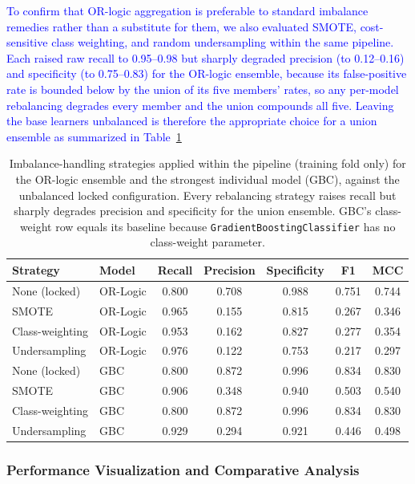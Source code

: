 \textcolor{blue}{To confirm that OR-logic aggregation is preferable to standard imbalance remedies rather than a substitute for them, we also evaluated SMOTE, cost-sensitive class weighting, and random undersampling within the same pipeline. Each raised raw recall to 0.95--0.98 but sharply degraded precision (to 0.12--0.16) and specificity (to 0.75--0.83) for the OR-logic ensemble, because its false-positive rate is bounded below by the union of its five members' rates, so any per-model rebalancing degrades every member and the union compounds all five. Leaving the base learners unbalanced is therefore the appropriate choice for a union ensemble as summarized in Table~\ref{tab:imbalance}}

\begin{table}[htbp]
\centering
\caption{Imbalance-handling strategies applied within the pipeline (training fold only) for the OR-logic ensemble and the strongest individual model (GBC), against the unbalanced locked configuration. Every rebalancing strategy raises recall but sharply degrades precision and specificity for the union ensemble. GBC's class-weight row equals its baseline because \texttt{GradientBoostingClassifier} has no class-weight parameter.}
\label{tab:imbalance}
\begin{tabular}{llccccc}
\hline
Strategy & Model & Recall & Precision & Specificity & F1 & MCC \\
\hline
None (locked)        & OR-Logic & 0.800 & 0.708 & 0.988 & 0.751 & 0.744 \\
SMOTE                & OR-Logic & 0.965 & 0.155 & 0.815 & 0.267 & 0.346 \\
Class-weighting      & OR-Logic & 0.953 & 0.162 & 0.827 & 0.277 & 0.354 \\
Undersampling        & OR-Logic & 0.976 & 0.122 & 0.753 & 0.217 & 0.297 \\
\hline
None (locked)        & GBC & 0.800 & 0.872 & 0.996 & 0.834 & 0.830 \\
SMOTE                & GBC & 0.906 & 0.348 & 0.940 & 0.503 & 0.540 \\
Class-weighting      & GBC & 0.800 & 0.872 & 0.996 & 0.834 & 0.830 \\
Undersampling        & GBC & 0.929 & 0.294 & 0.921 & 0.446 & 0.498 \\
\hline
\end{tabular}
\end{table}

\subsubsection{Performance Visualization and Comparative Analysis}

